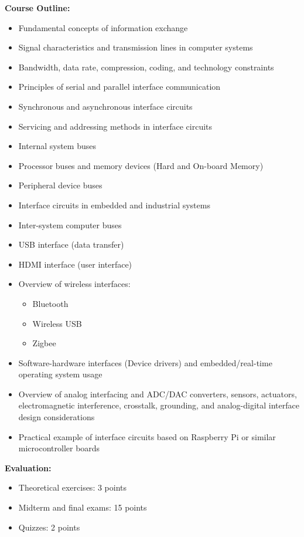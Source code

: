\documentclass[12pt]{article}
\begin{document}
\textbf{Course Outline:}
\begin{itemize}
    \item Fundamental concepts of information exchange
    \item Signal characteristics and transmission lines in computer systems
    \item Bandwidth, data rate, compression, coding, and technology constraints
    \item Principles of serial and parallel interface communication
    \item Synchronous and asynchronous interface circuits
    \item Servicing and addressing methods in interface circuits
    \item Internal system buses
    \item Processor buses and memory devices (Hard and On-board Memory)
    \item Peripheral device buses
    \item Interface circuits in embedded and industrial systems
    \item Inter-system computer buses
    \item USB interface (data transfer)
    \item HDMI interface (user interface)
    \item Overview of wireless interfaces:
    \begin{itemize}
        \item Bluetooth
        \item Wireless USB
        \item Zigbee
    \end{itemize}
    \item Software-hardware interfaces (Device drivers) and embedded/real-time operating system usage
    \item Overview of analog interfacing and ADC/DAC converters, sensors, actuators, electromagnetic interference, crosstalk, grounding, and analog-digital interface design considerations
    \item Practical example of interface circuits based on Raspberry Pi or similar microcontroller boards
\end{itemize}

\textbf{Evaluation:}
\begin{itemize}
    \item Theoretical exercises: 3 points
    \item Midterm and final exams: 15 points
    \item Quizzes: 2 points
\end{itemize}
\end{document}
